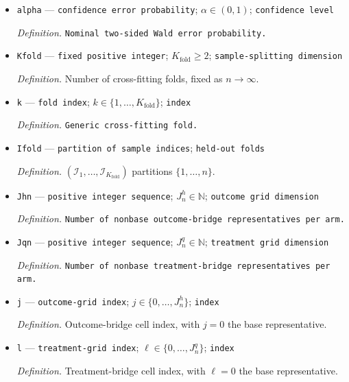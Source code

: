\documentclass{article}
\begin{document}
\begin{itemize}
  \par\smallskip\noindent\emph{Definition.} In the coordinate order \(z=0,1,2\), \(q_0^{\mathrm{sel}}=(0,8/3,16/3)\) and \(q_1^{\mathrm{sel}}=(16/3,8/3,0)\).
  \item \texttt{alpha} --- \texttt{confidence error probability}; \(\alpha\in(0,1)\); \texttt{confidence level}
  \par\smallskip\noindent\emph{Definition.} \texttt{Nominal two-\allowbreak{}sided Wald error probability.}
  \item \texttt{Kfold} --- \texttt{fixed positive integer}; \(K_{\mathrm{fold}}\ge2\); \texttt{sample-\allowbreak{}splitting dimension}
  \par\smallskip\noindent\emph{Definition.} Number of cross-fitting folds, fixed as \(n\to\infty\).
  \item \texttt{k} --- \texttt{fold index}; \(k\in\{1,\ldots,K_{\mathrm{fold}}\}\); \texttt{index}
  \par\smallskip\noindent\emph{Definition.} \texttt{Generic cross-\allowbreak{}fitting fold.}
  \item \texttt{Ifold} --- \texttt{partition of sample indices}; \texttt{held-\allowbreak{}out folds}
  \par\smallskip\noindent\emph{Definition.} \((\mathcal I_1,\ldots,\mathcal I_{K_{\mathrm{fold}}})\) partitions \(\{1,\ldots,n\}\).
  \item \texttt{Jhn} --- \texttt{positive integer sequence}; \(J_n^h\in\mathbb N\); \texttt{outcome grid dimension}
  \par\smallskip\noindent\emph{Definition.} \texttt{Number of nonbase outcome-\allowbreak{}bridge representatives per arm.}
  \item \texttt{Jqn} --- \texttt{positive integer sequence}; \(J_n^q\in\mathbb N\); \texttt{treatment grid dimension}
  \par\smallskip\noindent\emph{Definition.} \texttt{Number of nonbase treatment-\allowbreak{}bridge representatives per arm.}
  \item \texttt{j} --- \texttt{outcome-\allowbreak{}grid index}; \(j\in\{0,\ldots,J_n^h\}\); \texttt{index}
  \par\smallskip\noindent\emph{Definition.} Outcome-bridge cell index, with \(j=0\) the base representative.
  \item \texttt{l} --- \texttt{treatment-\allowbreak{}grid index}; \(\ell\in\{0,\ldots,J_n^q\}\); \texttt{index}
  \par\smallskip\noindent\emph{Definition.} Treatment-bridge cell index, with \(\ell=0\) the base representative.

\end{itemize}
\end{document}
